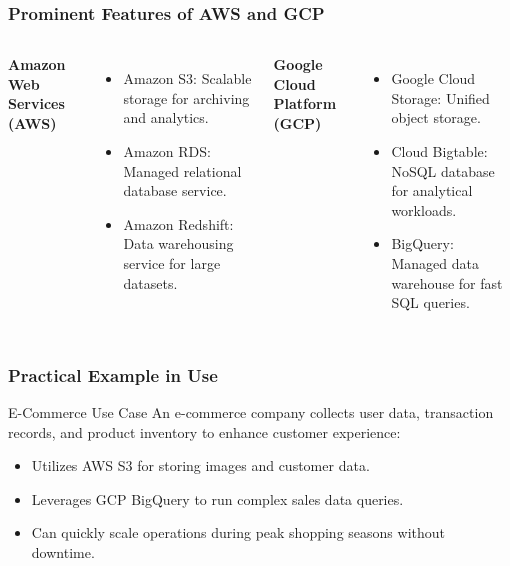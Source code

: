 \documentclass[aspectratio=169]{beamer}
\begin{document}
\begin{frame}[fragile]
    \frametitle{Prominent Features of AWS and GCP}
    \begin{columns}
            \textbf{Amazon Web Services (AWS)}
            \begin{itemize}
                \item Amazon S3: Scalable storage for archiving and analytics.
                \item Amazon RDS: Managed relational database service.
                \item Amazon Redshift: Data warehousing service for large datasets.
            \end{itemize}
            \textbf{Google Cloud Platform (GCP)}
            \begin{itemize}
                \item Google Cloud Storage: Unified object storage.
                \item Cloud Bigtable: NoSQL database for analytical workloads.
                \item BigQuery: Managed data warehouse for fast SQL queries.
            \end{itemize}
    \end{columns}
\end{frame}

\begin{frame}[fragile]
    \frametitle{Practical Example in Use}
    \begin{block}{E-Commerce Use Case}
        An e-commerce company collects user data, transaction records, and product inventory to enhance customer experience:
        \begin{itemize}
            \item Utilizes AWS S3 for storing images and customer data.
            \item Leverages GCP BigQuery to run complex sales data queries.
            \item Can quickly scale operations during peak shopping seasons without downtime.
        \end{itemize}
    \end{block}
\end{frame}
\end{document}
